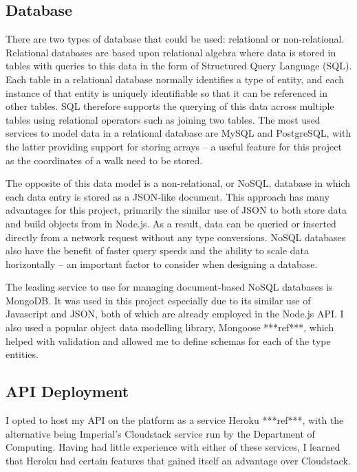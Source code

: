 \subsection{Database}

There are two types of database that could be used: relational or non-relational. Relational databases are based upon relational algebra where data is stored in tables with queries to this data in the form of Structured Query Language (SQL). Each table in a relational database normally identifies a type of entity, and each instance of that entity is uniquely identifiable so that it can be referenced in other tables. SQL therefore supports the querying of this data across multiple tables using relational operators such as joining two tables. The most used services to model data in a relational database are MySQL and PostgreSQL, with the latter providing support for storing arrays -- a useful feature for this project as the coordinates of a walk need to be stored.

The opposite of this data model is a non-relational, or NoSQL, database in which each data entry is stored as a JSON-like document. This approach has many advantages for this project, primarily the similar use of JSON to both store data and build objects from in Node.js. As a result, data can be queried or inserted directly from a network request without any type conversions. NoSQL databases also have the benefit of faster query speeds and the ability to scale data horizontally -- an important factor to consider when designing a database.

The leading service to use for managing document-based NoSQL databases is MongoDB. It was used in this project especially due to its similar use of Javascript and JSON, both of which are already employed in the Node.js API. I also used a popular object data modelling library, Mongoose ***ref***, which helped with validation and allowed me to define schemas for each of the type entities.

\subsection{API Deployment}

I opted to host my API on the platform as a service Heroku ***ref***, with the alternative being Imperial's Cloudstack service run by the Department of Computing. Having had little experience with either of these services, I learned that Heroku had certain features that gained itself an advantage over Cloudstack.

